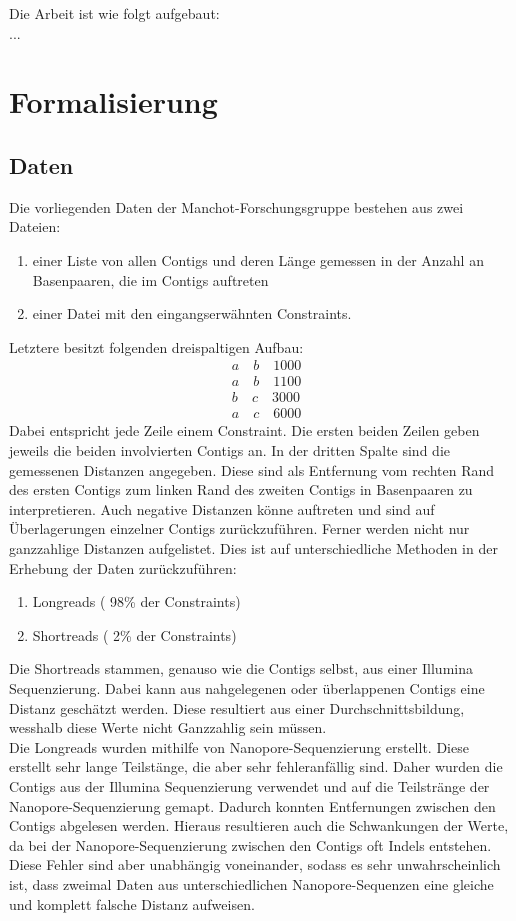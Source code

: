 Die Arbeit ist wie folgt aufgebaut:\\
...




\section{Formalisierung} \raggedbottom 
\subsection{Daten}
Die vorliegenden Daten der Manchot-Forschungsgruppe bestehen aus zwei Dateien: 
\begin{enumerate}
\item einer Liste von allen Contigs und deren Länge gemessen in der Anzahl an Basenpaaren, die im Contigs auftreten
\item einer Datei mit den eingangserwähnten Constraints.
\end{enumerate}
Letztere besitzt folgenden dreispaltigen Aufbau:
\begin{align*}
&a \quad b \quad 1000\\
&a \quad b \quad 1100\\
&b \quad c \quad 3000\\
&a \quad c \quad 6000
\end{align*}
Dabei entspricht jede Zeile einem Constraint. Die ersten beiden Zeilen geben jeweils die beiden involvierten Contigs an. In der dritten Spalte sind die gemessenen Distanzen angegeben. Diese sind als Entfernung vom rechten Rand des ersten Contigs zum linken Rand des zweiten Contigs in Basenpaaren zu interpretieren. Auch negative Distanzen könne auftreten und sind auf Überlagerungen einzelner Contigs zurückzuführen. Ferner werden nicht nur ganzzahlige Distanzen aufgelistet. Dies ist auf unterschiedliche Methoden in der Erhebung der Daten zurückzuführen:
\begin{enumerate}
\item Longreads ( 98\% der Constraints)
\item Shortreads ( 2\% der Constraints)
\end{enumerate}
Die Shortreads stammen, genauso wie die Contigs selbst, aus einer Illumina Sequenzierung. Dabei kann aus nahgelegenen oder überlappenen Contigs eine Distanz geschätzt werden. Diese resultiert aus einer Durchschnittsbildung, wesshalb diese Werte nicht Ganzzahlig sein müssen.\\
Die Longreads wurden mithilfe von Nanopore-Sequenzierung erstellt. Diese erstellt sehr lange Teilstänge, die aber sehr fehleranfällig sind. Daher wurden die Contigs aus der Illumina Sequenzierung verwendet und auf die Teilstränge der Nanopore-Sequenzierung gemapt. Dadurch konnten Entfernungen zwischen den Contigs abgelesen werden. Hieraus resultieren auch die Schwankungen der Werte, da bei der Nanopore-Sequenzierung zwischen den Contigs oft Indels entstehen. Diese Fehler sind aber unabhängig voneinander, sodass es sehr unwahrscheinlich ist, dass zweimal Daten aus unterschiedlichen Nanopore-Sequenzen eine gleiche und komplett falsche Distanz aufweisen.
